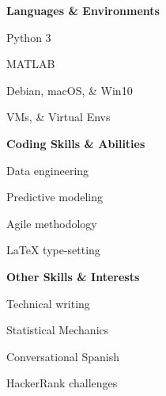 \documentclass[letterpaper,final]{memoir}
\newcommand{\LargeSep}{\vspace{1.3em}}
\newcommand{\Sep}{\vspace{1.0em}}
\newcommand{\SmallSep}{\vspace{0.4em}}
\newcommand{\CVItem}[1]
	{\textbf{\color{Blue} #1}}
\begin{document}
\Sep
\CVItem{Languages \& Environments}
\SmallSep

\begin{multicols}{4}

    \begin{compactitem}[\color{Blue}$\circ$]
		
		\item Python 3
        \SmallSep
        
        \item MATLAB
		\SmallSep
        
        \item Debian, macOS, \& Win10
        \SmallSep

        \item VMs, \& Virtual Envs
    
	\end{compactitem}

\end{multicols}

\Sep
\CVItem{Coding Skills \& Abilities}
\SmallSep

\begin{multicols}{4}

    \begin{compactitem}[\color{Blue}$\circ$]

        \item Data engineering
        \SmallSep

        \item Predictive modeling
        \SmallSep
   
        \item Agile methodology
        \SmallSep

        \item LaTeX type-setting
        
	\end{compactitem}

\end{multicols}

\Sep
\CVItem{Other Skills \& Interests}
\SmallSep

\begin{multicols}{4}

    \begin{compactitem}[\color{Blue}$\circ$] 

        \item Technical writing
        \SmallSep

        \item Statistical Mechanics
        \SmallSep
    
        \item Conversational Spanish
        \SmallSep 

		\item HackerRank challenges    
	\end{compactitem}
\end{multicols}
\LargeSep
\end{document}
